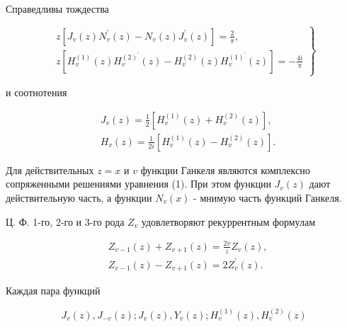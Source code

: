 \documentclass[10pt]{article}
\begin{document}
Справедливы тождества



\[

\left.\begin{array}{l}

z\left[J_{v}(z) N_{v}^{\prime}(z)-N_{v}(z) J_{v}^{\prime}(z)\right]=\frac{2}{\pi}, \\

z\left[H_{v}^{(1)}(z) H_{v}^{(2)^{\prime}}(z)-H_{v}^{(2)}(z) H_{v}^{(1)^{\prime}}(z)\right]=-\frac{4 i}{\pi}

\end{array}\right\}

\]



и соотнотения



\[

\begin{aligned}

& J_{v}(z)=\frac{1}{2}\left[H_{v}^{(1)}(z)+H_{v}^{(2)}(z)\right], \\

& H_{v}(z)=\frac{1}{2 i}\left[H_{v}^{(1)}(z)-H_{v}^{(2)}(z)\right] .

\end{aligned}

\]



Для действительных $z=x$ и $v$ функции Ганкеля являются комплексно сопряженными решениями уравнения (1). При этом функции $J_{v}(z)$ дают действительную часть, а функции $N_{v}(x)$ - мнимую часть функций Ганкеля.



Ц. Ф. 1-го, 2-го и 3-го рода $Z_{v}$ удовлетворяют рекуррентным формулам



\[

\begin{aligned}

& Z_{v-1}(z)+Z_{v+1}(z)=\frac{2 v}{z} Z_{v}(z), \\

& Z_{v-1}(z)-Z_{v+1}(z)=2 Z_{v}^{\prime}(z) .

\end{aligned}

\]



Каждая пара функций



\[

J_{v}(z), J_{-v}(z) ; J_{v}(z), Y_{v}(z) ; H_{v}^{(1)}(z), H_{v}^{(2)}(z)

\]
\end{document}
